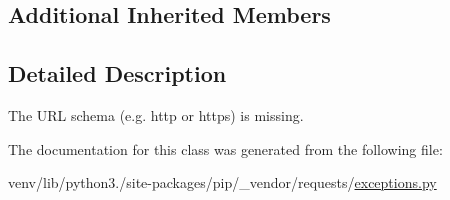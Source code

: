 \subsection*{Additional Inherited Members}


\subsection{Detailed Description}
\begin{DoxyVerb}The URL schema (e.g. http or https) is missing.\end{DoxyVerb}
 

The documentation for this class was generated from the following file\+:\begin{DoxyCompactItemize}
\item 
venv/lib/python3./site-\/packages/pip/\+\_\+vendor/requests/\hyperlink{pip_2__vendor_2requests_2exceptions_8py}{exceptions.\+py}\end{DoxyCompactItemize}
